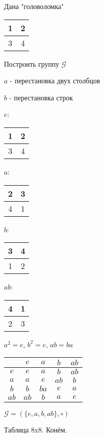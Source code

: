 \documentclass[../main/document.tex]{subfiles}
\begin{document}
\begin{exm}
Дана "головоломка"

\begin{table}[H]
\renewcommand*{\arraystretch}{1.4}
\begin{tabular}{|c|c|}
\hline
1 & 2\\\hline
3 & 4\\
\hline
\end{tabular}
\end{table}
Построить группу $\mathcal{G}$


$a$ - перестановка двух столбцов

$b$ - перестановка строк

\begin{table}[H]
$e$:
\begin{tabular}{|c|c|}
\hline
1 & 2\\\hline
3 & 4\\
\hline
\end{tabular}
$a$:
\begin{tabular}{|c|c|}
\hline
2 & 3\\\hline
4 & 1\\
\hline
\end{tabular}
$b$:
\begin{tabular}{|c|c|}
\hline
3 & 4\\\hline
1 & 2\\
\hline
\end{tabular}
$ab$:
\begin{tabular}{|c|c|}
\hline
4 & 1\\\hline
2 & 3\\
\hline
\end{tabular}
\end{table}

$a^2=e$, $b^2=e$, $ab=ba$
\begin{table}[H]
\centering
\begin{tabular}{c|c|c|c|c}
 & $e$& $a$&$b$&$ab$\\\hline
$e$& $e$& $a$&$b$&$ab$\\\hline 
$a$& $a$& $e$&$ab$&$b$\\\hline 
$b$& $b$& $ba$&$e$&$a$\\\hline 
$ab$& $ab$& $b$&$a$&$e$\\ 
\end{tabular}
\end{table}

$\mathcal{G}=(\{e,a,b,ab\},\circ)$
\end{exm}

\begin{exm}
Таблица 8x8. Конём.
\end{exm}
\end{document}
